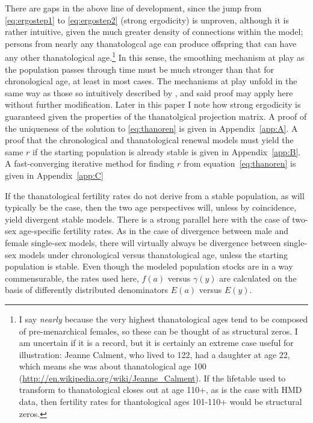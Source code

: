 \documentclass{article}
\begin{document}
There are gaps in the above line of development, since the jump from
\eqref{eq:ergostep1} to \eqref{eq:ergostep2} (strong ergodicity) is unproven,
although it is rather intuitive, given the much greater density of connections
within the model; persons from nearly any thanatologcal age can produce offspring that can have any other thanatological age.\footnote{I say
\textit{nearly} because the very highest thanatological ages tend to be
composed of pre-menarchical females, so these can be thought of as structural
zeros. I am uncertain if it is a record, but it is certainly an extreme case
useful for illustration: Jeanne Calment, who lived to 122, had a daughter at age
22, which means she was about thanatological age 100
(\url{http://en.wikipedia.org/wiki/Jeanne_Calment}). If the lifetable used to
transform to thanatological closes out at age 110+, as is the case with HMD data, then fertility rates for thantological ages 101-110+ would be structural
zeros.} In
this sense, the smoothing mechanism at play as the population passes through
time must be much stronger than that for chronological age, at least in most
cases.  The mechanisms at play unfold in the same way as those so intuitively
described by \citet{arthur1982ergodic}, and said proof may apply here without
further modification. Later in this paper I note how strong ergodicity is
guaranteed given the properties of the thanatolgical projection matrix. A proof
of the uniqueness of the solution to \eqref{eq:thanoren} is given in
Appendix~\ref{app:A}. A proof that the chronological and thanatological renewal
models must yield the same $r$ if the starting population is already stable is
given in Appendix~\ref{app:B}. A fast-converging iterative method for finding
$r$ from equation~\eqref{eq:thanoren} is given in Appendix~\ref{app:C}

If the thanatological fertility rates do not derive from a stable
population, as will typically be the case, then the two age perspectives
will, unless by coincidence, yield divergent stable models. There is a strong
parallel here with the case of two-sex age-specific fertility rates. As in the
case of divergence between male and female single-sex models, there will
virtually always be divergence between single-sex models under chronological
versus thanatological age, unless the starting population is stable. Even though the modeled population stocks are in a way commensurable, the rates used here, $f(a)$ versus $\gamma(y)$ are calculated on the basis of differently distributed denominators $E(a)$ versus $E(y)$.
\end{document}

